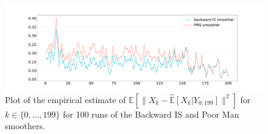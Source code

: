 \documentclass[12pt]{article}
\begin{document}
\begin{figure}[h]
\begin{center}
    \includegraphics[width=\textwidth, trim = 1cm 1cm 1cm 1cm, clip]{Figure1.pdf}
\end{center}
    \caption{Plot of the empirical estimate of $\mathbb{E}[\|X_k - \mathbb{\widehat{E}}[X_k|Y_{0:199}]\|^2]$ for $k \in \{0,...,199\}$ for 100 runs of the Backward IS and Poor Man smoothers.}
    \label{fig:RNN:mseperXk}
\end{figure}
\end{document}
